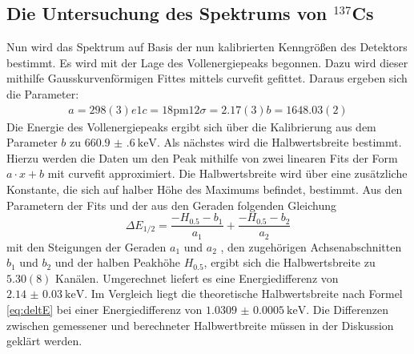 \subsection{Die Untersuchung des Spektrums von $^137$Cs}
Nun wird das Spektrum auf Basis der nun kalibrierten Kenngrößen des Detektors bestimmt. Es wird mit der Lage des Vollenergiepeaks begonnen. Dazu wird dieser mithilfe Gausskurvenförmigen Fittes mittels curvefit \cite{scipy} gefittet. Daraus ergeben sich die Parameter:
\begin{gather*}
a = \si{298(3)e1}
c = \si{18 \pm 12}
\sigma = \si{2.17(3)}
b = \si{1648.03(2)}
\end{gather*}
 Die Energie des Vollenergiepeaks ergibt sich über die Kalibrierung aus dem Parameter $b$ zu $\SI{660.9(6)}{\kilo\electronvolt}$.
 Als nächstes wird die Halbwertsbreite bestimmt. Hierzu werden die Daten um den Peak mithilfe von zwei linearen Fits der Form $ a \cdot x + b$ mit curvefit\cite{scipy} approximiert. Die Halbwertsbreite wird über eine zusätzliche Konstante, die sich auf halber Höhe des Maximums befindet, bestimmt. Aus den Parametern der Fits und der aus den Geraden folgenden Gleichung
\begin{equation}
    \Delta E_\text{1/2} = \frac{-H_{0.5}-b_1}{a_1} + \frac{-H_{0.5}-b_2}{a_2} \label{eq:Z}
\end{equation}
mit den Steigungen der Geraden $a_1$ und $a_2$ , den zugehörigen Achsenabschnitten $b_1$ und $b_2$ und der halben Peakhöhe $H_{0.5}$, ergibt sich die Halbwertsbreite zu $\si{5.30(8)}$ Kanälen. Umgerechnet liefert es eine Energiedifferenz von $\SI{2.14(3)}{\kilo\electronvolt}$.
Im Vergleich liegt die theoretische Halbwertsbreite nach Formel \eqref{eq:deltE} bei einer Energiedifferenz von $\SI{1.0309(5)}{\kilo\electronvolt}$. Die Differenzen zwischen gemessener und berechneter Halbwertbreite müssen in der Diskussion geklärt werden. 
